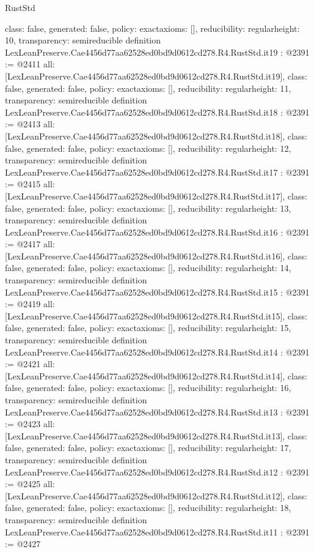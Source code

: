 \begin{lexlean}{RustStd}
\begin{coremodule}
{  class: false,
  generated: false,
  policy: exact{axioms: []},
  reducibility: regular{height: 10},
  transparency: semireducible
}
definition LexLeanPreserve.Cae4456d77aa62528ed0bd9d0612cd278.R4.RustStd.it19 : @2391 := @2411 {
  all: [LexLeanPreserve.Cae4456d77aa62528ed0bd9d0612cd278.R4.RustStd.it19],
  class: false,
  generated: false,
  policy: exact{axioms: []},
  reducibility: regular{height: 11},
  transparency: semireducible
}
definition LexLeanPreserve.Cae4456d77aa62528ed0bd9d0612cd278.R4.RustStd.it18 : @2391 := @2413 {
  all: [LexLeanPreserve.Cae4456d77aa62528ed0bd9d0612cd278.R4.RustStd.it18],
  class: false,
  generated: false,
  policy: exact{axioms: []},
  reducibility: regular{height: 12},
  transparency: semireducible
}
definition LexLeanPreserve.Cae4456d77aa62528ed0bd9d0612cd278.R4.RustStd.it17 : @2391 := @2415 {
  all: [LexLeanPreserve.Cae4456d77aa62528ed0bd9d0612cd278.R4.RustStd.it17],
  class: false,
  generated: false,
  policy: exact{axioms: []},
  reducibility: regular{height: 13},
  transparency: semireducible
}
definition LexLeanPreserve.Cae4456d77aa62528ed0bd9d0612cd278.R4.RustStd.it16 : @2391 := @2417 {
  all: [LexLeanPreserve.Cae4456d77aa62528ed0bd9d0612cd278.R4.RustStd.it16],
  class: false,
  generated: false,
  policy: exact{axioms: []},
  reducibility: regular{height: 14},
  transparency: semireducible
}
definition LexLeanPreserve.Cae4456d77aa62528ed0bd9d0612cd278.R4.RustStd.it15 : @2391 := @2419 {
  all: [LexLeanPreserve.Cae4456d77aa62528ed0bd9d0612cd278.R4.RustStd.it15],
  class: false,
  generated: false,
  policy: exact{axioms: []},
  reducibility: regular{height: 15},
  transparency: semireducible
}
definition LexLeanPreserve.Cae4456d77aa62528ed0bd9d0612cd278.R4.RustStd.it14 : @2391 := @2421 {
  all: [LexLeanPreserve.Cae4456d77aa62528ed0bd9d0612cd278.R4.RustStd.it14],
  class: false,
  generated: false,
  policy: exact{axioms: []},
  reducibility: regular{height: 16},
  transparency: semireducible
}
definition LexLeanPreserve.Cae4456d77aa62528ed0bd9d0612cd278.R4.RustStd.it13 : @2391 := @2423 {
  all: [LexLeanPreserve.Cae4456d77aa62528ed0bd9d0612cd278.R4.RustStd.it13],
  class: false,
  generated: false,
  policy: exact{axioms: []},
  reducibility: regular{height: 17},
  transparency: semireducible
}
definition LexLeanPreserve.Cae4456d77aa62528ed0bd9d0612cd278.R4.RustStd.it12 : @2391 := @2425 {
  all: [LexLeanPreserve.Cae4456d77aa62528ed0bd9d0612cd278.R4.RustStd.it12],
  class: false,
  generated: false,
  policy: exact{axioms: []},
  reducibility: regular{height: 18},
  transparency: semireducible
}
definition LexLeanPreserve.Cae4456d77aa62528ed0bd9d0612cd278.R4.RustStd.it11 : @2391 := @2427 {
}
\end{coremodule}
\end{lexlean}
